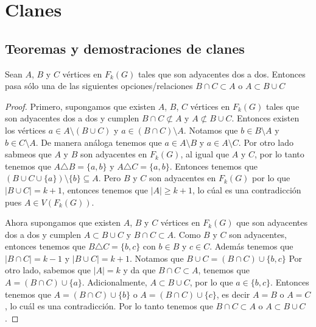 \chapter{Clanes}%
\label{cap:ejemplos}

\section{Teoremas y demostraciones de clanes}%
\label{sec:etiquetas}


\begin{lema}%
        \label{lem:adyacencia de tres vertices}
        Sean $A$, $B$ y $C$ v\'ertices en $F_k(G)$ tales que son adyacentes
        dos a dos. Entonces pasa s\'olo una de las siguientes
        opciones/relaciones $B \cap C \subset A$ o $A \subset B \cup C$
        \end{lema}

    
    \begin{proof}
        Primero, supongamos que existen $A$, $B$, $C$ v\'ertices en $F_k(G)$
        tales que son adyacentes dos a dos y cumplen $B \cap C \not\subset A$ y
        $A \not\subset B \cup C$. Entonces existen los v\'ertices  $a \in A
        \setminus (B \cup C)$ y $a \in (B \cap C)\setminus A$. Notamos que $b
        \in B \setminus A$ y $b \in C \setminus A$. De manera an\'aloga tenemos
        que $a \in A \setminus B$ y $a \in A \setminus C$. Por otro lado sabmeos
        que $A$ y $B$ son adyacentes en $F_k(G)$, al igual que $A$ y $C$, por lo
        tanto tenemos que $A \triangle B = \{a,b\}$ y $A \triangle C = \{a,
        b\}$. Entonces tenemos que $(B \cup C \cup \{a\})\setminus \{b\}
        \subseteq A$. Pero $B$ y $C$ son adyacentes en $F_k(G)$ por lo que $|B
        \cup C| = k+1$, entonces tenemos que $|A| \geq k+1$, lo c\'ual es una
        contradicci\'on pues $A \in V (F_k(G))$. 

        Ahora supongamos que existen $A$, $B$ y $C$ v\'ertices en $F_k(G)$ que
        son adyacentes dos a dos y cumplen $A \subset B \cup C$ y $B \cap C
        \subset A$. Como $B$ y $C$ son adyacentes, entonces tenemos que $B
        \triangle C = \{b,c\}$ con $b \in B$ y $c \in C$. Adem\'as tenemos que
        $|B \cap C| = k-1$ y $|B \cup C| = k +1$. Notamos que $B \cup C = (B\cap
        C) \cup \{b,c\}$ Por otro lado, sabemos que $|A|=k$ y da que $B \cap C
        \subset A$, tenemos que $A = (B \cap C) \cup \{a\}$. Adicionalmente, $A
        \subset B \cup C$, por lo que $a \in \{b, c\}$. Entonces tenemos que $A
        = (B \cap C) \cup \{b\}$ o $A = (B \cap C) \cup \{c\}$, es decir $A = B$
        o $A=C$, lo cu\'al es una contradicci\'on. Por lo tanto tenemos que $B
        \cap C \subset A$ o $A \subset B \cup C$.
    \end{proof}

